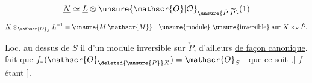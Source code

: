 \[
\underline{N}\simeq\underline{L}\otimes\unsure{\mathscr{O}|\mathcal{O}}_{\unsure{\check{P}|\widetilde{P}}}(1)
\]
\[
\underline{N}\otimes_{\mathscr{O}_{S}}\underline{L}^{-1}=\unsure{M|\mathscr{M}}
\quad\text{\unsure{module} \unsure{inversible} sur }X\times_{S}\check{P}.
\]

Loc. au dessus de $S$ il  d'un module inversible sur $\check{P}$, d'ailleurs \uline{de façon canonique}.  fait que $f_{*}(\mathscr{O}_{\deleted{\unsure{P}}X})=\mathscr{O}_{S}$ [  que ce soit  ,] $f$ étant   ].
